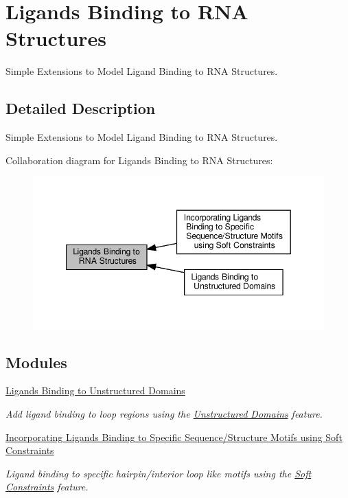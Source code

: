 \hypertarget{group__ligand__binding}{}\section{Ligands Binding to R\+NA Structures}
\label{group__ligand__binding}


Simple Extensions to Model Ligand Binding to R\+NA Structures.  




\subsection{Detailed Description}
Simple Extensions to Model Ligand Binding to R\+NA Structures. 

Collaboration diagram for Ligands Binding to R\+NA Structures\+:
\nopagebreak
\begin{figure}[H]
\begin{center}
\leavevmode
\includegraphics[width=349pt]{group__ligand__binding}
\end{center}
\end{figure}
\subsection*{Modules}
\begin{DoxyCompactItemize}
\item 
\hyperlink{group__ligands__up}{Ligands Binding to Unstructured Domains}
\begin{DoxyCompactList}\small\item\em Add ligand binding to loop regions using the \hyperlink{group__domains__up}{Unstructured Domains} feature. \end{DoxyCompactList}\item 
\hyperlink{group__constraints__ligand}{Incorporating Ligands Binding to Specific Sequence/\+Structure Motifs using Soft Constraints}
\begin{DoxyCompactList}\small\item\em Ligand binding to specific hairpin/interior loop like motifs using the \hyperlink{group__soft__constraints}{Soft Constraints} feature. \end{DoxyCompactList}\end{DoxyCompactItemize}
